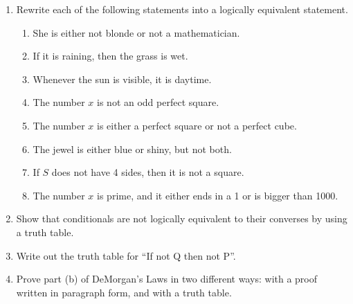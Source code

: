 \probsec{~\ref{sec:negat-logic-equiv}}
\begin{enumerate}
    \item Rewrite each of the following statements into a logically equivalent statement.
  \begin{enumerate}
      \item She is either not blonde or not a mathematician.
      \item If it is raining, then the grass is wet.
      \item Whenever the sun is visible, it is daytime.
      \item The number $x$ is not an odd perfect square.
      \item The number $x$ is either a perfect square or not a perfect cube.
      \item The jewel is either blue or shiny, but not both.
      \item If $S$ does not have 4 sides, then it is not a square.
      \item The number $x$ is prime, and it either ends in a 1 or is bigger than 1000.
  \end{enumerate}

    \item Show that conditionals are not logically equivalent to their converses by using a truth table.

    \item Write out the truth table for ``If not Q then not P''.

    \item Prove part (b) of DeMorgan's Laws in two different ways: with a proof written in paragraph form, and with a truth table.



\end{enumerate}
